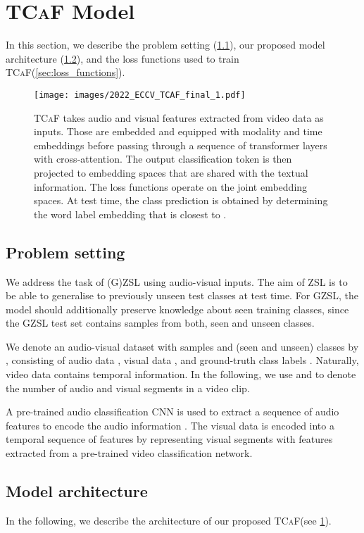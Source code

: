 \documentclass[runningheads]{llncs}
\newcommand{\modelName}{\textsc{TCaF}\xspace}
\begin{document}
\section{\modelName Model}
In this section, we describe the problem setting (\cref{sec:problem_setting}), our proposed model architecture (\cref{sec:architecture}), and the loss functions used to train \modelName (\cref{sec:loss_functions}).


\begin{figure}[t]
    \centering
    \texttt{[image: images/2022\_ECCV\_TCAF\_final\_1.pdf]}
    \caption{\modelName takes audio and visual features extracted from video data as inputs. Those are embedded and equipped with modality and time embeddings before passing through a sequence of  transformer layers with cross-attention. The output classification token  is then projected to embedding spaces that are shared with the textual information. The loss functions operate on the joint embedding spaces. At test time, the class prediction  is obtained by determining the word label embedding  that is closest to .
    }
    \label{fig:architecture}
\end{figure}


\subsection{Problem setting}\label{sec:problem_setting}
We address the task of (G)ZSL using audio-visual inputs. The aim of ZSL is to be able to generalise to previously unseen test classes at test time. For GZSL, the model should additionally preserve knowledge about seen training classes, since the GZSL test set contains samples from both, seen and unseen classes.

We denote an audio-visual dataset with  samples and  (seen and unseen) classes by , consisting of audio data , visual data , and ground-truth class labels . Naturally, video data contains temporal information. In the following, we use  and  to denote the number of audio and visual segments in a video clip.

A pre-trained audio classification CNN is used to extract a sequence of audio features  to encode the audio information .
The visual data  is encoded into a temporal sequence of features  by representing visual segments with features extracted from a pre-trained video classification network.


\subsection{Model architecture}\label{sec:architecture}
In the following, we describe the architecture of our proposed \modelName (see \cref{fig:architecture}). 
\end{document}
